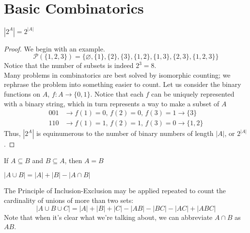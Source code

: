 \documentclass[11pt,twosided]{article}
\begin{document}
\section{Basic Combinatorics}
\begin{theorem}
$|2^A|=2^{|A|}$
\end{theorem}
\begin{proof} 
We begin with an example.
$$\mathcal{P}(\{1, 2, 3\}) = \{\varnothing, \{1\}, \{2\}, \{3\}, \{1, 2\}, \{1, 3\}, \{2, 3\}, \{1, 2, 3\}\}$$
Notice that the number of subsets is indeed $2^3 = 8$. \\
Many problems in combinatorics are best solved by isomorphic counting; we rephrase the problem into something easier to count. Let us consider the binary functions on $A$,  $f: A \rightarrow \{0, 1\}$. Notice that each $f$ can be uniquely represented with a binary string, which in turn represents a way to make a subset of $A$
\begin{align*}
    001 &\rightarrow f(1) = 0,\, f(2) = 0,\, f(3) = 1 \rightarrow \{3\}\\
    110 &\rightarrow f(1) = 1,\, f(2) = 1,\, f(3) = 0 \rightarrow \{1, 2\}
\end{align*}
Thus, $|2^A|$ is equinumerous to the number of binary numbers of length $|A|$, or $2^{|A|}$.
\end{proof}

\begin{theorem}
If $A \subseteq B$ and $B \subseteq A$, then $A = B$
\end{theorem}
\begin{theorem}
$|A\cup B| = |A| + |B| - |A \cap B|$
\end{theorem}
The Principle of Inclusion-Exclusion may be applied repeated to count the cardinality of unions of more than two sets:
$$|A\cup B\cup C| = |A| + |B| + |C| - |AB| - |BC| - |AC| + |ABC|$$
Note that when it's clear what we're talking about, we can abbreviate $A\cap B$ as $AB$.
\end{document}
